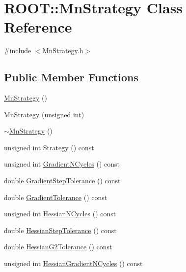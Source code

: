 \hypertarget{classROOT_1_1Minuit2_1_1MnStrategy}{}\section{R\+O\+OT\+:\+:Mn\+Strategy Class Reference}
\label{classROOT_1_1Minuit2_1_1MnStrategy}


{\ttfamily \#include $<$Mn\+Strategy.\+h$>$}

\subsection*{Public Member Functions}
\begin{DoxyCompactItemize}
\item 
\mbox{\hyperlink{classROOT_1_1Minuit2_1_1MnStrategy_a231337ee8aec47874370bc4b64683374}{Mn\+Strategy}} ()
\item 
\mbox{\hyperlink{classROOT_1_1Minuit2_1_1MnStrategy_ad70367966dc3b7cdf1be671acb3824d0}{Mn\+Strategy}} (unsigned int)
\item 
\mbox{\hyperlink{classROOT_1_1Minuit2_1_1MnStrategy_a65ddda119cec991c9d07671c1a8af521}{$\sim$\+Mn\+Strategy}} ()
\item 
unsigned int \mbox{\hyperlink{classROOT_1_1Minuit2_1_1MnStrategy_a1ff03f5ccec83aa19770d080b2be2334}{Strategy}} () const
\item 
unsigned int \mbox{\hyperlink{classROOT_1_1Minuit2_1_1MnStrategy_ab2f1980e3eb9f9b0818cf6f8c24b6311}{Gradient\+N\+Cycles}} () const
\item 
double \mbox{\hyperlink{classROOT_1_1Minuit2_1_1MnStrategy_a5352522cca1056c242a309d29e28e3c2}{Gradient\+Step\+Tolerance}} () const
\item 
double \mbox{\hyperlink{classROOT_1_1Minuit2_1_1MnStrategy_a94681b616c41570e2c81ef5c94cb81dd}{Gradient\+Tolerance}} () const
\item 
unsigned int \mbox{\hyperlink{classROOT_1_1Minuit2_1_1MnStrategy_ab2342c7f4896a8ed08c9df93fca93066}{Hessian\+N\+Cycles}} () const
\item 
double \mbox{\hyperlink{classROOT_1_1Minuit2_1_1MnStrategy_aaee4b3cbe14d4caa2d57fbc93b451ac2}{Hessian\+Step\+Tolerance}} () const
\item 
double \mbox{\hyperlink{classROOT_1_1Minuit2_1_1MnStrategy_a0b111848a04cb9b95615402c78709846}{Hessian\+G2\+Tolerance}} () const
\item 
unsigned int \mbox{\hyperlink{classROOT_1_1Minuit2_1_1MnStrategy_a49354e374820b73f7e8b6701d7e07922}{Hessian\+Gradient\+N\+Cycles}} () const

\end{DoxyCompactItemize}
